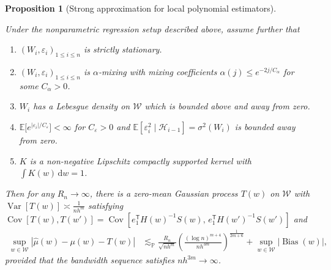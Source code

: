 \documentclass[11pt,lof]{puthesis}
\renewcommand{\P}{\ensuremath{\mathbb{P}}}
\newcommand{\E}{\ensuremath{\mathbb{E}}}
\newcommand{\cH}{\ensuremath{\mathcal{H}}}
\newcommand{\cW}{\ensuremath{\mathcal{W}}}
\newcommand{\T}{\ensuremath{\mathsf{T}}}
\DeclareMathOperator{\Var}{Var}
\DeclareMathOperator{\Cov}{Cov}
\DeclareMathOperator{\Bias}{Bias}
\newcommand{\diff}[1]{\,\mathrm{d}#1}
\theoremstyle{break}
\newtheorem{proposition}{Proposition}[section]
\theoremstyle{proof}
\begin{document}
\begin{proposition}[Strong approximation for local polynomial estimators]%
  \label{pro:yurinskii_local_poly}

  Under the nonparametric regression setup described above,
  assume further that
  \begin{enumerate}[label=(\roman*)]

    \item
      $(W_i, \varepsilon_i)_{1 \leq i \leq n}$
      is strictly stationary.

    \item
      $(W_i, \varepsilon_i)_{1 \leq i \leq n}$
      is $\alpha$-mixing with mixing coefficients
      $\alpha(j) \leq e^{-2 j / C_\alpha}$
      for some $C_\alpha > 0$.

    \item
      $W_i$ has a Lebesgue density on $\cW$
      which is bounded above and away from zero.

    \item
      $\E\big[e^{|\varepsilon_i|/C_\varepsilon}\big] < \infty$
      for $C_\varepsilon > 0$ and
      $\E\left[\varepsilon^2_i \mid \cH_{i-1}\right]=\sigma^2(W_i)$
      is bounded away from zero.

    \item
      $K$ is a non-negative Lipschitz
      compactly supported kernel with
      $\int K(w) \diff{w} = 1$.

  \end{enumerate}
  Then for any $R_n \to \infty$,
  there is a zero-mean Gaussian process
  $T(w)$ on $\cW$
  with $\Var[T(w)] \asymp\frac{1}{n h^m}$
  satisfying $\Cov[T(w), T(w')] = \Cov[e_1^\T H(w)^{-1} S(w),\, e_1^\T
  H(w')^{-1} S(w')]$ and
  \begin{align*}
    \sup_{w \in \cW}
    \left|\hat \mu(w) - \mu(w) - T(w) \right|
    &\lesssim_\P
    \frac{R_n}{\sqrt{n h^m}}
    \left(
      \frac{(\log n)^{m+4}}{n h^{3m}}
    \right)^{\frac{1}{2m+6}}
    + \sup_{w \in \cW} |\Bias(w)|,
  \end{align*}
  provided that the bandwidth sequence satisfies
  $n h^{3m} \to \infty$.
\end{proposition}
\end{document}
